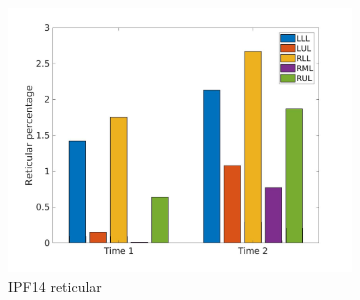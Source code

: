 \begin{figure}[H]
\begin{subfigure}{.46\linewidth}%
  \includegraphics[width=\linewidth,trim={{.0\wd0} {.0\wd0} {.0\wd0} {.0\wd0}},clip]{Appendix/Image_AppexA/LobarDistribution/IPF14ReticularLobarRegionDiseaseDistributionOverTime.jpg}
  \caption{IPF14 reticular}
  \label{fig:IPF14LobarRegionDiseaseDistributionOverTime-b}
\end{subfigure}
\begin{subfigure}{.46\linewidth}%

\end{subfigure}
\end{figure}
